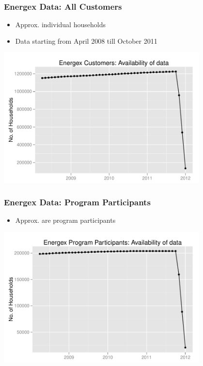 \documentclass{beamer}
\begin{document}
\begin{frame}
\frametitle{Energex Data: All Customers}
\begin{itemize}
\item Approx.  individual households
\item Data starting from April 2008 till October 2011
\end{itemize}
\begin{center}
\includegraphics[width=0.8\textwidth]{figures/EnergexAvailData}
\end{center}
\end{frame}

\begin{frame}
\frametitle{Energex Data: Program Participants}
\begin{itemize}
\item Approx.  are program participants
\end{itemize}
\begin{center}
\includegraphics[width=0.8\textwidth]{figures/EnergexPartAvailData}
\end{center}
\end{frame}
\end{document}
